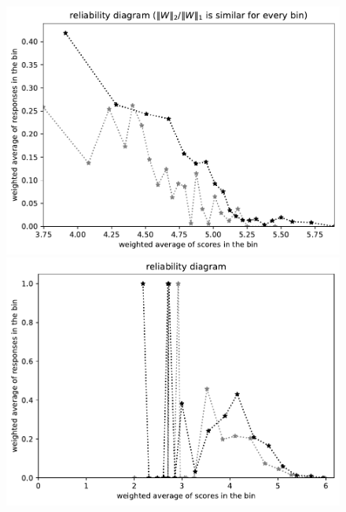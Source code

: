 \documentclass{article}
\newlength{\vertsep}
\newlength{\imsize}
\begin{document}
\begin{figure}
\begin{centering}
\parbox{\imsize}{\includegraphics[width=\imsize]
{../codes/weighted/County_of_San_Francisco_vs_Kern-LNGI/equierrs20.pdf}}
\quad\quad
\parbox{\imsize}{\includegraphics[width=\imsize]
{../codes/weighted/County_of_San_Francisco_vs_Kern-LNGI/equiscores20.pdf}}

\vspace{\vertsep}


\end{centering}
\end{figure}
\end{document}
